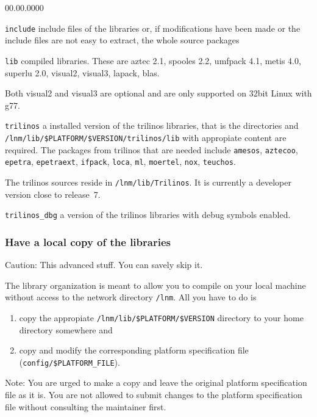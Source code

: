 \begin{lyxlist}{00.00.0000}
\item [{\texttt{include}}] include files of the libraries or, if modifications
have been made or the include files are not easy to extract, the whole
source packages
\item [{\texttt{lib}}] compiled libraries. These are aztec 2.1, spooles
2.2, umfpack 4.1, metis 4.0, superlu 2.0, visual2, visual3, lapack,
blas.


Both visual2 and visual3 are optional and are only supported on 32bit
Linux with g77.

\item [{\texttt{trilinos}}] a installed version of the trilinos libraries,
that is the directories 
and \texttt{/lnm/lib/\$PLATFORM/\$VERSION/trilinos/lib} with appropiate
content are required. The packages from trilinos that are needed include
\texttt{amesos}, \texttt{aztecoo}, \texttt{epetra}, \texttt{epetraext},
\texttt{ifpack}, \texttt{loca}, \texttt{ml}, \texttt{moertel}, \texttt{nox},
\texttt{teuchos}.


The trilinos sources reside in \texttt{/lnm/lib/Trilinos}. It is currently
a developer version close to release~7.

\item [{\texttt{trilinos\_dbg}}] a version of the trilinos libraries with
debug symbols enabled.
\end{lyxlist}

\subsubsection{Have a local copy of the \ccarat{} libraries}

Caution: This advanced stuff. You can savely skip it.

The \ccarat{} library organization is meant to allow you to compile
\ccarat{} on your local machine without access to the network directory
\texttt{/lnm}. All you have to do is

\begin{enumerate}
\item copy the appropiate \texttt{/lnm/lib/\$PLATFORM/\$VERSION} directory
to your home directory somewhere and
\item copy and modify the corresponding platform specification file (\texttt{config/\$PLATFORM\_FILE}).
\end{enumerate}
Note: You are urged to make a copy and leave the original platform
specification file as it is. You are not allowed to submit changes
to the platform specification file without consulting the \ccarat{}
maintainer first.


